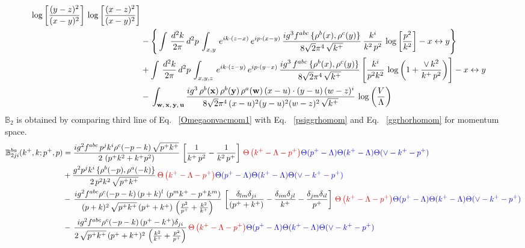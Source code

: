 \documentclass[aps,prd,amsmath,amssymb,nofootinbib]{revtex4-2}
\def\mf#1{\mathbb{#1}}
\numberwithin{equation}{section}
\begin{document}
\begin{align}
\log{\left[\frac{(y-z)^{2}}{(x-y)^{2}}\right]}\,\log{\left[\frac{(x-z)^{2}}{(x-y)^{2}}\right]} \notag \\ & -\Bigg\{ \int\, \frac{d^{2}k}{2\pi}\, d^{2}p\, \int_{x,y}\, e^{ik\cdot (z-x)}\, e^{ip\cdot (x-y)}\, \frac{ig^{3}f^{abc}\,\{\rho^{b}(x),\rho^{c}(y)\}}{8\sqrt{2}\pi^{4}\, \sqrt{k^{+}}}\, \frac{k^{i}}{k^{2}\,p^{2}}\, \log{\left[\frac{p^{2}}{k^{2}}\right]}-x\leftrightarrow y \Bigg\}\notag \\ & +  \int\, \frac{d^{2}k}{2\pi}\, d^{2}p\, \int_{x,y,z}\,e^{ik\cdot (z-y)}\, e^{ip\cdot (y-x)}\, \frac{ig^{3}\,f^{abc}\,\{\rho^{b}(x),\rho^{c}(y)\}}{8\sqrt{2}\pi^{4}\,\sqrt{k^{+}}}\, \Bigg[\frac{k^{i}}{p^{2}k^{2}}\,\log{\left(1+\frac{\vee\, k^{2}}{k^{+}\, p^{2}}\right)}\Bigg]-x\leftrightarrow y \notag \\ & -\,\int_{\mathbf{w},\, \mathbf{x},\, \mathbf{y},\, \mathbf{u}}\frac{ig^{3}\,\rho^{b}(\mathbf{x})\,\rho^{b}(\mathbf{y})\,\rho^{a}(\mathbf{w})\, (x-u)\cdot (y-u)\,(w-z)^{i}}{8\sqrt{2}\pi^{4}\,(x-u)^{2}(y-u)^{2}(w-z)^{2}\,\sqrt{k^{+}}}\,\log{\left(\frac{V}{\Lambda}\right)}
\end{align}
$\mf{B}_{2}$ is obtained by comparing third line of Eq.~ \eqref{Omegaonvacmom1} with Eq.~ \eqref{psiggrhomom} and Eq.~ \eqref{ggrhorhomom} for momentum space.
\begin{align}
    \mf{B}^{ba}_{2ji}(k^{+},k;p^{+},p) & =  \frac{ig^{2}f^{abc}\,p^{j}k^{i}\rho^{c}(-p-k)\, \sqrt{p^{+}k^{+}}}{2\,\left(p^{+}k^{2}+k^{+}p^{2}\right)}\,\left[\frac{1}{k^{+}\,p^{2}} - \frac{1}{k^{2}\,p^{+}}\right]\,\textcolor{red}{\Theta\left(k^{+}-\Lambda-p^{+}\right)}\textcolor{blue}{\Theta(p^{+}-\Lambda)\Theta(k^{+}-\Lambda)\Theta(\vee-k^{+}-p^{+})}\notag \\ & + \frac{g^{2}p^{j}k^{i}\,\{\rho^{b}(-p),\rho^{a}(-k)\}}{2\,p^{2}k^{2}\, \sqrt{p^{+}k^{+}}}\,\textcolor{red}{\Theta\left(k^{+}-\Lambda-p^{+}\right)}\textcolor{blue}{\Theta(p^{+}-\Lambda)\Theta(k^{+}-\Lambda)\Theta(\vee-k^{+}-p^{+})}\notag \\ & -\,\frac{ig^{2}f^{abc}\rho^{c}(-p-k)\,(p+k)^{l}\,\left(p^{m}k^{+}-p^{+}k^{m}\right)}{(p+k)^{2}\,\sqrt{p^{+}k^{+}}\,(p^{+}+k^{+})\,\left(\frac{p^{2}}{p^{+}}+\frac{k^{2}}{k^{+}}\right)}\,\left[\frac{\delta_{lm}\delta_{ji}}{(p^{+}+k^{+})} - \frac{\delta_{im}\delta_{jl}}{k^{+}} - \frac{\delta_{jm}\delta_{il}}{p^{+}}\right]\,\textcolor{red}{\Theta\left(k^{+}-\Lambda-p^{+}\right)}\textcolor{blue}{\Theta(p^{+}-\Lambda)\Theta(k^{+}-\Lambda)\Theta(\vee-k^{+}-p^{+})}\notag \\ & -\,\frac{ig^{2}f^{abc}\rho^{c}(-p-k)\,(p^{+}-k^{+})\delta_{ji}}{2\,\sqrt{p^{+}k^{+}}\,(p^{+}+k^{+})^{2}\,\left(\frac{k^{2}}{k^{+}}+\frac{p^{2}}{p^{+}}\right)}\,\textcolor{red}{\Theta\left(k^{+}-\Lambda-p^{+}\right)}\textcolor{blue}{\Theta(p^{+}-\Lambda)\Theta(k^{+}-\Lambda)\Theta(\vee-k^{+}-p^{+})}
\end{align}
\end{document}
